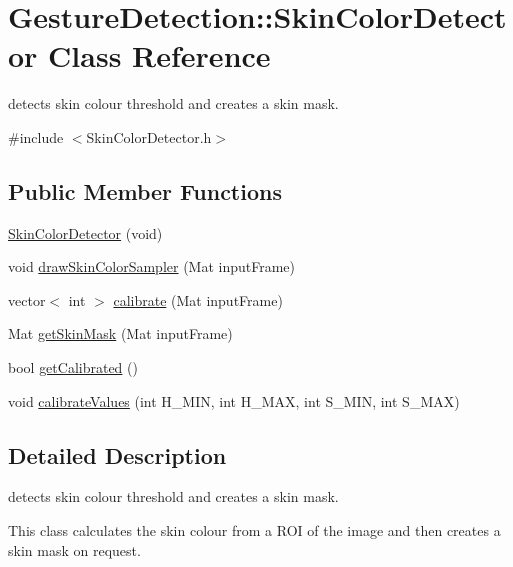 \hypertarget{classGestureDetection_1_1SkinColorDetector}{}\section{Gesture\+Detection\+:\+:Skin\+Color\+Detector Class Reference}
\label{classGestureDetection_1_1SkinColorDetector}


detects skin colour threshold and creates a skin mask.  




{\ttfamily \#include $<$Skin\+Color\+Detector.\+h$>$}

\subsection*{Public Member Functions}
\begin{DoxyCompactItemize}
\item 
\hyperlink{classGestureDetection_1_1SkinColorDetector_ab059f7f926aac46a712db749b4df4f27}{Skin\+Color\+Detector} (void)
\item 
void \hyperlink{classGestureDetection_1_1SkinColorDetector_a4eb701f5b2761027b3e752d6b3de46c2}{draw\+Skin\+Color\+Sampler} (Mat input\+Frame)
\item 
vector$<$ int $>$ \hyperlink{classGestureDetection_1_1SkinColorDetector_ae8b3880d1d75b07e356cd7d1ff128ed9}{calibrate} (Mat input\+Frame)
\item 
Mat \hyperlink{classGestureDetection_1_1SkinColorDetector_a8cf2f51c4c7797a126b767e48458a006}{get\+Skin\+Mask} (Mat input\+Frame)
\item 
bool \hyperlink{classGestureDetection_1_1SkinColorDetector_ad02c96fbc75934c86d22dd90ee726373}{get\+Calibrated} ()
\item 
void \hyperlink{classGestureDetection_1_1SkinColorDetector_a4739dae25a983fb35a972f3c0ff8faaf}{calibrate\+Values} (int H\+\_\+\+M\+IN, int H\+\_\+\+M\+AX, int S\+\_\+\+M\+IN, int S\+\_\+\+M\+AX)
\end{DoxyCompactItemize}


\subsection{Detailed Description}
detects skin colour threshold and creates a skin mask. 

This class calculates the skin colour from a R\+OI of the image and then creates a skin mask on request. 

